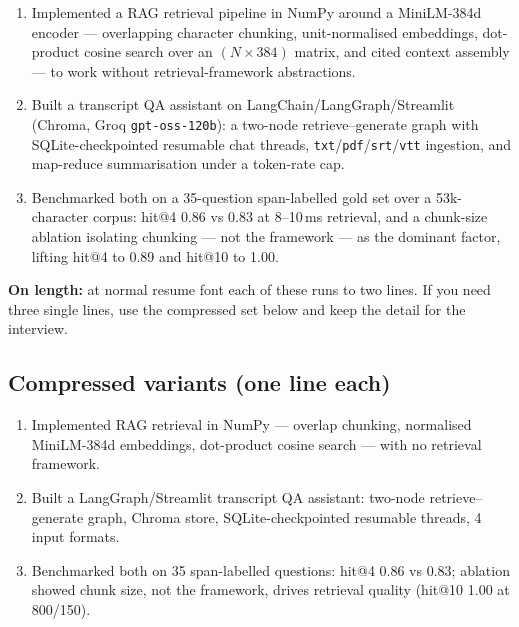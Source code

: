 \documentclass[11pt,a4paper]{article}
\begin{document}
\begin{enumerate}[leftmargin=*,itemsep=5pt]

\item Implemented a RAG retrieval pipeline in NumPy around a MiniLM-384d encoder
--- overlapping character chunking, unit-normalised embeddings, dot-product cosine
search over an $(N \times 384)$ matrix, and cited context assembly --- to work
without retrieval-framework abstractions.

\item Built a transcript QA assistant on LangChain/LangGraph/Streamlit (Chroma,
Groq \texttt{gpt-oss-120b}): a two-node retrieve--generate graph with
SQLite-checkpointed resumable chat threads, \texttt{txt}/\texttt{pdf}/\texttt{srt}/\texttt{vtt}
ingestion, and map-reduce summarisation under a token-rate cap.

\item Benchmarked both on a 35-question span-labelled gold set over a
53k-character corpus: hit@4 0.86 vs 0.83 at 8--10\,ms retrieval, and a chunk-size
ablation isolating chunking --- not the framework --- as the dominant factor,
lifting hit@4 to 0.89 and hit@10 to 1.00.

\end{enumerate}

\noindent
\textbf{On length:} at normal resume font each of these runs to two lines. If you
need three single lines, use the compressed set below and keep the detail for the
interview.

\subsection{Compressed variants (one line each)}

\begin{enumerate}[leftmargin=*,itemsep=4pt]
  \item Implemented RAG retrieval in NumPy --- overlap chunking, normalised
        MiniLM-384d embeddings, dot-product cosine search --- with no retrieval framework.
  \item Built a LangGraph/Streamlit transcript QA assistant: two-node
        retrieve--generate graph, Chroma store, SQLite-checkpointed resumable threads, 4 input formats.
  \item Benchmarked both on 35 span-labelled questions: hit@4 0.86 vs 0.83;
        ablation showed chunk size, not the framework, drives retrieval quality (hit@10 1.00 at 800/150).
\end{enumerate}
\end{document}

